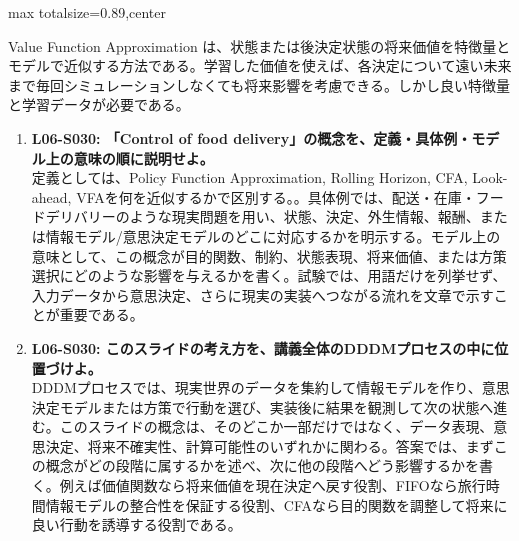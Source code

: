 \begin{minipage}[t]{0.58\textwidth}
\begin{adjustbox}{max totalsize={\textwidth}{0.89\textheight},center}
\begin{minipage}{\textwidth}
Value Function Approximation は、状態または後決定状態の将来価値を特徴量とモデルで近似する方法である。学習した価値を使えば、各決定について遠い未来まで毎回シミュレーションしなくても将来影響を考慮できる。しかし良い特徴量と学習データが必要である。\par{}\begin{enumerate}\item \textbf{L06-S030: 「Control of food delivery」の概念を、定義・具体例・モデル上の意味の順に説明せよ。}\\定義としては、Policy Function Approximation, Rolling Horizon, CFA, Look-ahead, VFAを何を近似するかで区別する。。具体例では、配送・在庫・フードデリバリーのような現実問題を用い、状態、決定、外生情報、報酬、または情報モデル/意思決定モデルのどこに対応するかを明示する。モデル上の意味として、この概念が目的関数、制約、状態表現、将来価値、または方策選択にどのような影響を与えるかを書く。試験では、用語だけを列挙せず、入力データから意思決定、さらに現実の実装へつながる流れを文章で示すことが重要である。\item \textbf{L06-S030: このスライドの考え方を、講義全体のDDDMプロセスの中に位置づけよ。}\\DDDMプロセスでは、現実世界のデータを集約して情報モデルを作り、意思決定モデルまたは方策で行動を選び、実装後に結果を観測して次の状態へ進む。このスライドの概念は、そのどこか一部だけではなく、データ表現、意思決定、将来不確実性、計算可能性のいずれかに関わる。答案では、まずこの概念がどの段階に属するかを述べ、次に他の段階へどう影響するかを書く。例えば価値関数なら将来価値を現在決定へ戻す役割、FIFOなら旅行時間情報モデルの整合性を保証する役割、CFAなら目的関数を調整して将来に良い行動を誘導する役割である。\end{enumerate}
\end{minipage}
\end{adjustbox}
\end{minipage}


